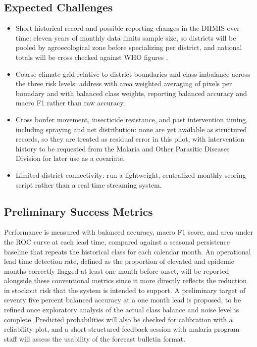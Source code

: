 \documentclass[11pt]{article}
\begin{document}
\subsection{Expected Challenges}
\begin{itemize}
\item Short historical record and possible reporting changes in the DHMIS over time: eleven years of monthly data limits sample size, so districts will be pooled by agroecological zone before specializing per district, and national totals will be cross checked against WHO figures \cite{who2024}.
\item Coarse climate grid relative to district boundaries and class imbalance across the three risk levels: address with area weighted averaging of pixels per boundary and with balanced class weights, reporting balanced accuracy and macro F1 rather than raw accuracy.
\item Cross border movement, insecticide resistance, and past intervention timing, including spraying and net distribution: none are yet available as structured records, so they are treated as residual error in this pilot, with intervention history to be requested from the Malaria and Other Parasitic Diseases Division for later use as a covariate.
\item Limited district connectivity: run a lightweight, centralized monthly scoring script rather than a real time streaming system.
\end{itemize}

\subsection{Preliminary Success Metrics}
Performance is measured with balanced accuracy, macro F1 score, and area under the ROC curve at each lead time, compared against a seasonal persistence baseline that repeats the historical class for each calendar month. An operational lead time detection rate, defined as the proportion of elevated and epidemic months correctly flagged at least one month before onset, will be reported alongside these conventional metrics since it more directly reflects the reduction in stockout risk that the system is intended to support. A preliminary target of seventy five percent balanced accuracy at a one month lead is proposed, to be refined once exploratory analysis of the actual class balance and noise level is complete. Predicted probabilities will also be checked for calibration with a reliability plot, and a short structured feedback session with malaria program staff will assess the usability of the forecast bulletin format.
\end{document}

